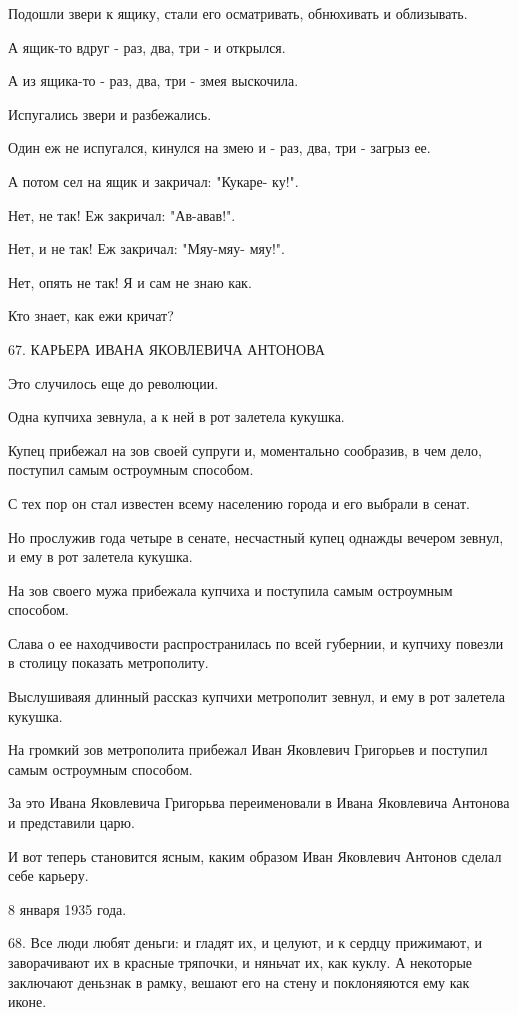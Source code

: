 \documentclass{article}
\begin{document}
Подошли звери к ящику, стали его осматривать, обнюхивать и облизывать.

А ящик-то вдруг - раз, два, три - и открылся.

А из ящика-то - раз, два, три - змея выскочила.

Испугались звери и разбежались.

Один еж не испугался, кинулся на змею и
- раз, два, три - загрыз ее.

А потом сел на ящик и закричал: "Кукаре- ку!".

Нет, не так! Еж закричал: "Ав-авав!".

Нет, и не так! Еж закричал: "Мяу-мяу- мяу!".

Нет, опять не так! Я и сам не знаю как.

Кто знает, как ежи кричат?

67. КАРЬЕРА
         ИВАНА ЯКОВЛЕВИЧА АНТОНОВА
    
Это случилось еще до революции.
    
Одна купчиха зевнула, а к ней в рот залетела кукушка.
    
Купец прибежал на зов своей супруги и, моментально сообразив, в чем дело,
поступил самым остроумным способом.
    
С тех пор он стал известен всему населению города и его выбрали в сенат.
    
Но прослужив года четыре в сенате, несчастный купец однажды вечером зевнул, и
ему в рот залетела кукушка.
    
На зов своего мужа прибежала купчиха и поступила самым остроумным способом.
    
Слава о ее находчивости распространилась по всей губернии, и купчиху повезли в
столицу показать метрополиту.
    
Выслушиваяя длинный рассказ купчихи метрополит зевнул, и ему в рот залетела
кукушка.
    
На громкий зов метрополита прибежал Иван Яковлевич Григорьев и поступил самым
остроумным способом.
    
За это Ивана Яковлевича Григорьва переименовали в Ивана Яковлевича Антонова и
представили царю.
    
И вот теперь становится ясным, каким образом Иван Яковлевич Антонов сделал
себе карьеру.

                         8 января 1935 года.

68.
Все люди любят деньги: и гладят их, и целуют, и к сердцу прижимают, и
заворачивают их в красные тряпочки, и няньчат их, как куклу. А некоторые
заключают деньзнак в рамку, вешают его на стену и поклоняяются ему как иконе.
    
\end{document}

